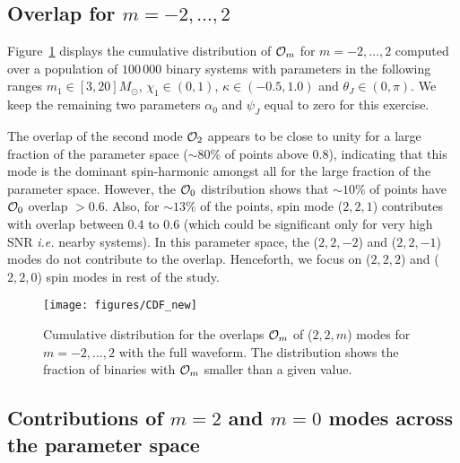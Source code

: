 \documentclass[preprint,onecolumn,,tightenlines,superscriptaddress,showpacs,nofootinbib,eqsecnum,amsfonts,amsmath]{revtex4}
\begin{document}
\subsection{Overlap for $m=-2,\dots,2$}\label{IIIa}

Figure~\ref{FIG7} displays the cumulative distribution of ${\cal{O}}_{m}$ for $m=-2,\dots,2$ computed over a population of $100\,000$ binary systems with parameters in the following 
ranges $m_1 \in [3, 20] M_{\odot}$, $\chi_1 \in (0, 1)$, $\kappa \in (-0.5, 1.0)$ and $\theta_J \in(0, \pi)$. We keep the remaining two parameters $\alpha_0$ and $\psi_J$ equal to zero 
for this exercise. 

The overlap of the second mode ${\cal{O}}_2$ appears to be close to unity for a large fraction of the parameter space ($\sim 80\%$ of points above $0.8$), indicating that this mode 
is the dominant spin-harmonic amongst all for the large fraction of the parameter space. However, the ${\cal{O}}_0$ distribution shows that $\sim 10 \%$ of points have ${\cal{O}}_0$ overlap $> 0.6$. Also, for
$\sim 13\%$ of the points, spin mode
($2,2,1$) contributes with overlap between 0.4 to 0.6 (which
could be significant only for very high SNR {\it i.e.} nearby systems). In this parameter space, the ($2,2,-2$) and ($2,2,-1$)
modes do not contribute to the overlap. Henceforth, we focus on  ($2,2,2$) and ($2,2,0$)
spin modes in rest of the study.

\begin{figure}[!htbp]
\centering
{
\texttt{[image: figures/CDF\_new]}
} 
\caption{Cumulative distribution for the overlaps ${\cal{O}}_{m}$ of ($2,2,m$)
  modes for $m=-2,\dots,2$ with the full waveform. The distribution shows the fraction of binaries
  with ${\cal O}_m$ smaller than a given value.}
\label{FIG7}
\end{figure}
\subsection{Contributions of $m=2$ and $m=0$ modes across the parameter space}
\label{IIIb}
\end{document}
